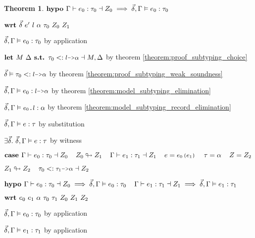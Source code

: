 \documentclass[acmsmall]{acmart}
\theoremstyle{definition}
\newtheorem{theorem}{Theorem}[section]
\begin{document}
\begin{theorem}
  \item \Z $\textbf{hypo } 
    \Gamma \vdash e_0 : \tau_0 \dashv Z_0 
    \implies 
    \vec{\delta}, \Gamma \vDash e_0 : \tau_0
  $ 
  \item \Z $\B{wrt } \vec{\delta}\ e' \ l \ \alpha \ \tau_0 \ Z_0 \ Z_1$ 

    \item \Z\Z $
      \vec{\delta}, \Gamma \vDash e_0 : \tau_0
    $ by application

    \item \Z\Z $
      \B{let }
      M\ \Delta
      \B{ s.t. }
      \tau_0 \subtypes \J{$l$->$\alpha$} \given M, \Delta
    $ by theorem \ref{theorem:proof_subtyping_choice}


    \item \Z\Z $
      \vec{\delta} \satisfies \tau_0  \subtypes \J{$l$->$\alpha$}
    $ by theorem \ref{theorem:proof_subtyping_weak_soundness}
    \item \Z\Z $
      \vec{\delta}, \Gamma \satisfies e_0 \hastype \J{$l$->$\alpha$}
    $ by theorem \ref{theorem:model_subtyping_elimination} 
    \item \Z\Z $
      \vec{\delta}, \Gamma \satisfies \J{$e_0$.$l$} \hastype \alpha 
    $ by theorem \ref{theorem:model_subtyping_record_elimination} 
    \item \Z\Z $
      \vec{\delta}, \Gamma \vDash e : \tau
    $ by substitution 
    \item \Z\Z $
      \exists \vec{\delta} .\ \vec{\delta}, \Gamma \vDash e : \tau
    $ by witness 


  \item \Z $\B{case } 
    \Gamma \entails e_0 \hastype \tau_0 \given Z_0
    \I
    Z_0 \looparrowright Z_1
    \I
    \Gamma \entails e_1 \hastype \tau_1 \given Z_1
    \I
    e = \J{$e_0$($e_1$)} 
    \I 
    \tau = \alpha 
    \I
    Z = Z_2
  $ 
  \item \Z $ 
    Z_1 \looparrowright Z_2
    \I
    \tau_0 \subtypes \J{$\tau_1$->$\alpha$} \given Z_2
  $ 
  \item \Z $\textbf{hypo } 
    \Gamma \vdash e_0 : \tau_0 \dashv Z_0
    \implies 
    \vec{\delta}, \Gamma \vDash e_0 : \tau_0
    \hspace{4mm}
    \Gamma \vdash e_1 : \tau_1 \dashv Z_1
    \implies 
    \vec{\delta}, \Gamma \vDash e_1 : \tau_1
  $ 
  \item \Z $\B{wrt } e_0\ e_1\ \alpha\ \tau_0\ \tau_1\ Z_0\ Z_1\ Z_2 $ 
    \item \Z\Z $
      \vec{\delta}, \Gamma \vDash e_0 : \tau_0
    $ by application
    \item \Z\Z $
      \vec{\delta}, \Gamma \vDash e_1 : \tau_1
    $ by application


\end{theorem}
\end{document}

